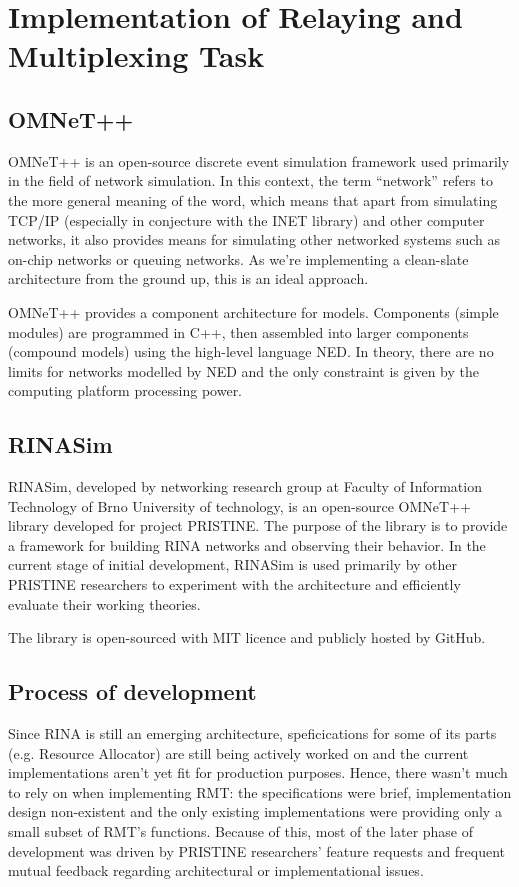 \chapter{Implementation of Relaying and Multiplexing Task}\label{implementation}

    \section{OMNeT++}

        OMNeT++ is an open-source discrete event simulation framework used primarily in the field of network simulation. In this context, the term ``network'' refers to the more general meaning of the word, which means that apart from simulating TCP/IP (especially in conjecture with the INET library) and other computer networks, it also provides means for simulating other networked systems such as on-chip networks or queuing networks. As we're implementing a clean-slate architecture from the ground up, this is an ideal approach.

        OMNeT++ provides a component architecture for models. Components (simple modules) are programmed in C++, then assembled into larger components (compound models) using the high-level language NED. In theory, there are no limits for networks modelled by NED and the only constraint is given by the computing platform processing power.

    \section{RINASim}

        RINASim, developed by networking research group at Faculty of Information Technology of Brno University of technology, is an open-source OMNeT++ library developed for project PRISTINE. The purpose of the library is to provide a framework for building RINA networks and observing their behavior. In the current stage of initial development, RINASim is used primarily by other PRISTINE researchers to experiment with the architecture and efficiently evaluate their working theories.

        The library is open-sourced with MIT licence and publicly hosted by GitHub.

    \section{Process of development}

        Since RINA is still an emerging architecture, speficications for some of its parts (e.g. Resource Allocator) are still being actively worked on and the current implementations aren't yet fit for production purposes. Hence, there wasn't much to rely on when implementing RMT: the specifications were brief, implementation design non-existent and the only existing implementations were providing only a small subset of RMT's functions. Because of this, most of the later phase of development was driven by PRISTINE researchers' feature requests and frequent mutual feedback regarding architectural or implementational issues.

